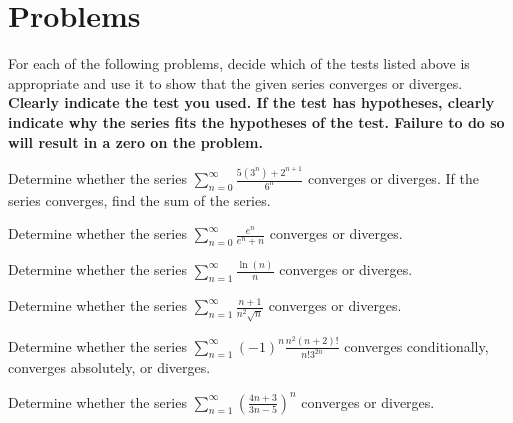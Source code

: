 \documentclass[12pt]{amsart}
\begin{document}
\section{Problems}
\setcounter{thm}{0}
For each of the following problems, decide which of the tests listed above is appropriate and use it to show that the given series converges or diverges.
\textbf{
  Clearly indicate the test you used.
  If the test has hypotheses, clearly indicate why the series fits the hypotheses of the test.
  Failure to do so will result in a zero on the problem.
}

\begin{thm}[5 Points]
  Determine whether the series
  \(\displaystyle{\sum_{n = 0}^\infty \frac{5(3^n) + 2^{n+1}}{6^n}}\)
  converges or diverges.
  If the series converges, find the sum of the series.
\end{thm}

\vspace{2in}

\begin{thm}[5 Points]
  Determine whether the series
  \(\displaystyle{\sum_{n=0}^\infty \frac{e^n}{e^n + n}}\)
  converges or diverges.
\end{thm}

\vspace{2in}

\begin{thm}[5 Points]
  Determine whether the series
  \(\displaystyle{\sum_{n=1}^\infty \frac{\ln(n)}{n}}\)
  converges or diverges.
\end{thm}

\newpage

\begin{thm}[10 Points]
    Determine whether the series
    \(\displaystyle{\sum_{n=1}^\infty \frac{n+1}{n^2\sqrt{n}}}\)
  converges or diverges.
\end{thm}

\vspace{2in}

\begin{thm}[10 Points]
    Determine whether the series
    \(\displaystyle{\sum_{n = 1}^\infty (-1)^{n} \frac{n^2(n+2)!}{n! 3^{2n}}}\)
    converges conditionally, converges absolutely, or diverges.
\end{thm}

\vspace{2in}

\begin{thm}[15 Points]
    Determine whether the series
    \(\displaystyle{\sum_{n = 1}^\infty \left(\frac{4n+3}{3n-5}\right)^n}\)
    converges or diverges.
\end{thm}
\end{document}
